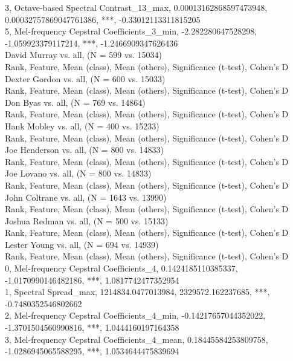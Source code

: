 3, Octave-based Spectral Contrast_13_max, 0.00013162868597473948, 0.00032757869047761386, ***, -0.33012113311815205\\
5, Mel-frequency Cepstral Coefficients_3_min, -2.282280647528298, -1.059923379117214, ***, -1.2466909347626436\\
David Murray vs. all, (N = 599 vs. 15034)\\
Rank, Feature, Mean (class), Mean (others), Significance (t-test), Cohen's D\\
Dexter Gordon vs. all, (N = 600 vs. 15033)\\
Rank, Feature, Mean (class), Mean (others), Significance (t-test), Cohen's D\\
Don Byas vs. all, (N = 769 vs. 14864)\\
Rank, Feature, Mean (class), Mean (others), Significance (t-test), Cohen's D\\
Hank Mobley vs. all, (N = 400 vs. 15233)\\
Rank, Feature, Mean (class), Mean (others), Significance (t-test), Cohen's D\\
Joe Henderson vs. all, (N = 800 vs. 14833)\\
Rank, Feature, Mean (class), Mean (others), Significance (t-test), Cohen's D\\
Joe Lovano vs. all, (N = 800 vs. 14833)\\
Rank, Feature, Mean (class), Mean (others), Significance (t-test), Cohen's D\\
John Coltrane vs. all, (N = 1643 vs. 13990)\\
Rank, Feature, Mean (class), Mean (others), Significance (t-test), Cohen's D\\
Joshua Redman vs. all, (N = 500 vs. 15133)\\
Rank, Feature, Mean (class), Mean (others), Significance (t-test), Cohen's D\\
Lester Young vs. all, (N = 694 vs. 14939)\\
Rank, Feature, Mean (class), Mean (others), Significance (t-test), Cohen's D\\
0, Mel-frequency Cepstral Coefficients_4, 0.1424185110385337, -1.0170990146482186, ***, 1.0817742477352954\\
1, Spectral Spread_max, 1214834.0477013984, 2329572.162237685, ***, -0.7480352546802662\\
2, Mel-frequency Cepstral Coefficients_4_min, -0.14217657044352022, -1.3701504560990816, ***, 1.0444160197164358\\
3, Mel-frequency Cepstral Coefficients_4_mean, 0.18445584253809758, -1.0286945065588295, ***, 1.0534644475839694\\
